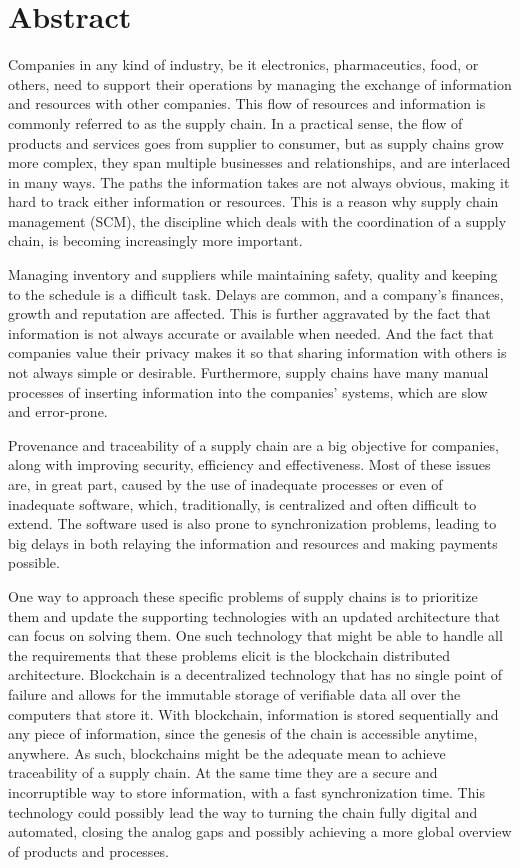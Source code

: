 \chapter{Abstract}
Companies in any kind of industry, be it electronics, pharmaceutics, food, or others, need to support their operations by managing the exchange of information and resources with other companies. This flow of resources and information is commonly referred to as the supply chain. In a practical sense, the flow of products and services goes from supplier to consumer, but as supply chains grow more complex, they span multiple businesses and relationships, and are interlaced in many ways. The paths the information takes are not always obvious, making it hard to track either information or resources. This is a reason why supply chain management (SCM), the discipline which deals with the coordination of a supply chain, is becoming increasingly more important. 

Managing inventory and suppliers while maintaining safety, quality and keeping to the schedule is a difficult task. Delays are common, and a company's finances, growth and reputation are affected. This is further aggravated by the fact that information is not always accurate or available when needed. And the fact that companies value their privacy makes it so that sharing information with others is not always simple or desirable. Furthermore, supply chains have many manual processes of inserting information into the companies' systems, which are slow and error-prone.

Provenance and traceability of a supply chain are a big objective for companies, along with improving security, efficiency and effectiveness. Most of these issues are, in great part, caused by the use of inadequate processes or even of inadequate software, which, traditionally, is centralized and often difficult to extend. The software used is also prone to synchronization problems, leading to big delays in both relaying the information and resources and making payments possible. 

One way to approach these specific problems of supply chains is to prioritize them and update the supporting technologies with an updated architecture that can focus on solving them. One such technology that might be able to handle all the requirements that these problems elicit is the blockchain distributed architecture. Blockchain is a decentralized technology that has no single point of failure and allows for the immutable storage of verifiable data all over the computers that store it. With blockchain, information is stored sequentially and any piece of information, since the genesis of the chain is accessible anytime, anywhere. As such, blockchains might be the adequate mean to achieve traceability of a supply chain. At the same time they are a secure and incorruptible way to store information, with a fast synchronization time. This technology could possibly lead the way to turning the chain fully digital and automated, closing the analog gaps and possibly achieving a more global overview of products and processes.

